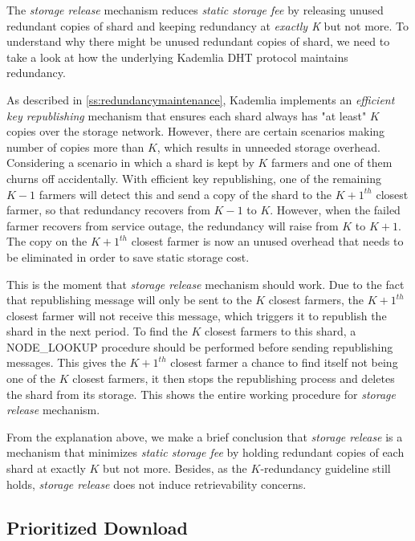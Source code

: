 The \textit{storage release} mechanism reduces \textit{static storage fee} by releasing unused redundant copies of shard and keeping redundancy at \textit{exactly K} but not more. To understand why there might be unused redundant copies of shard, we need to take a look at how the underlying Kademlia DHT protocol maintains redundancy.

As described in \ref{ss:redundancymaintenance}, Kademlia implements an \textit{efficient key republishing} mechanism that ensures each shard always has "at least" $K$ copies over the storage network. However, there are certain scenarios making number of copies more than $K$, which results in unneeded storage overhead. Considering a scenario in which a shard is kept by $K$ farmers and one of them churns off accidentally. With efficient key republishing, one of the remaining $K-1$
farmers will detect this and send a copy of the shard to the $K+1^{th}$ closest farmer, so that redundancy recovers from $K-1$ to $K$. However, when the failed farmer recovers from service outage, the redundancy will raise from $K$ to $K+1$. The copy on the $K+1^{th}$ closest farmer is now an unused overhead that needs to be eliminated in order to save static storage cost.

This is the moment that \textit{storage release} mechanism should work. Due to the fact that republishing message will only be sent to the $K$ closest farmers, the $K+1^{th}$ closest farmer will not receive this message, which triggers it to republish the shard in the next period. To find the $K$ closest farmers to this shard, a NODE\_LOOKUP procedure should be performed before sending republishing messages. This gives the $K+1^{th}$ closest farmer a chance to find itself not being one of the $K$ closest farmers, it then stops the republishing process and deletes the shard from its storage. This shows the entire working procedure for \textit{storage release} mechanism.

From the explanation above, we make a brief conclusion that \textit{storage release} is a mechanism that minimizes \textit{static storage fee} by holding redundant copies of each shard at exactly $K$ but not more. Besides, as the $K$-redundancy guideline still holds, \textit{storage release} does not induce retrievability concerns.

\subsection{Prioritized Download}
\label{ss:prioritizeddownload}


